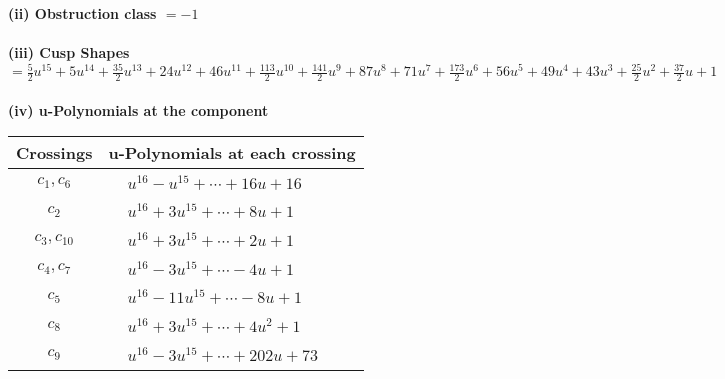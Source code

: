 \documentclass[1p]{elsarticle_modified}
\theoremstyle{definition}
\begin{document}
\flushleft \textbf{(ii) Obstruction class $= -1$}\\~\\
\flushleft \textbf{(iii) Cusp Shapes $= \frac{5}{2} u^{15}+5 u^{14}+\frac{35}{2} u^{13}+24 u^{12}+46 u^{11}+\frac{113}{2} u^{10}+\frac{141}{2} u^9+87 u^8+71 u^7+\frac{173}{2} u^6+56 u^5+49 u^4+43 u^3+\frac{25}{2} u^2+\frac{37}{2} u+1$}\\~\\
\newpage\renewcommand{\arraystretch}{1}
\flushleft \textbf{(iv) u-Polynomials at the component}\newline \\
\begin{tabular}{m{50pt}|m{274pt}}
Crossings & \hspace{64pt}u-Polynomials at each crossing \\
\hline $$\begin{aligned}c_{1},c_{6}\end{aligned}$$&$\begin{aligned}
&u^{16}- u^{15}+\cdots+16 u+16
\end{aligned}$\\
\hline $$\begin{aligned}c_{2}\end{aligned}$$&$\begin{aligned}
&u^{16}+3 u^{15}+\cdots+8 u+1
\end{aligned}$\\
\hline $$\begin{aligned}c_{3},c_{10}\end{aligned}$$&$\begin{aligned}
&u^{16}+3 u^{15}+\cdots+2 u+1
\end{aligned}$\\
\hline $$\begin{aligned}c_{4},c_{7}\end{aligned}$$&$\begin{aligned}
&u^{16}-3 u^{15}+\cdots-4 u+1
\end{aligned}$\\
\hline $$\begin{aligned}c_{5}\end{aligned}$$&$\begin{aligned}
&u^{16}-11 u^{15}+\cdots-8 u+1
\end{aligned}$\\
\hline $$\begin{aligned}c_{8}\end{aligned}$$&$\begin{aligned}
&u^{16}+3 u^{15}+\cdots+4 u^2+1
\end{aligned}$\\
\hline $$\begin{aligned}c_{9}\end{aligned}$$&$\begin{aligned}
&u^{16}-3 u^{15}+\cdots+202 u+73
\end{aligned}$\\
\hline
\end{tabular}\\~\\
\end{document}
